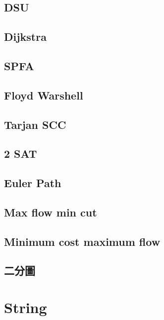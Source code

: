 \subsection{DSU} 

\subsection{Dijkstra} 

\subsection{SPFA} 

\subsection{Floyd Warshell} 

\subsection{Tarjan SCC} 

\subsection{2 SAT} 

\subsection{Euler Path}

% 
\subsection{Max flow min cut} 

\subsection{Minimum cost maximum flow} 

\subsection{二分圖} 


\section{String}

